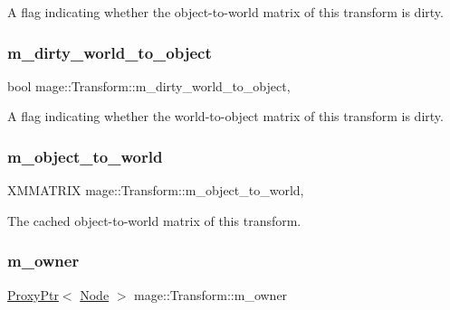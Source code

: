 A flag indicating whether the object-\/to-\/world matrix of this transform is dirty. \hypertarget{classmage_1_1_transform_af0778d1dbe677b7af16add3c14a6259e}{}\label{classmage_1_1_transform_af0778d1dbe677b7af16add3c14a6259e} 
\subsubsection{\texorpdfstring{m\+\_\+dirty\+\_\+world\+\_\+to\+\_\+object}{m\_dirty\_world\_to\_object}}
{\footnotesize\ttfamily bool mage\+::\+Transform\+::m\+\_\+dirty\+\_\+world\+\_\+to\+\_\+object\hspace{0.3cm}{\ttfamily [mutable]}, {\ttfamily [private]}}

A flag indicating whether the world-\/to-\/object matrix of this transform is dirty. \hypertarget{classmage_1_1_transform_a4e227321c984ddf2ece92d7954ae5db9}{}\label{classmage_1_1_transform_a4e227321c984ddf2ece92d7954ae5db9} 
\subsubsection{\texorpdfstring{m\+\_\+object\+\_\+to\+\_\+world}{m\_object\_to\_world}}
{\footnotesize\ttfamily X\+M\+M\+A\+T\+R\+IX mage\+::\+Transform\+::m\+\_\+object\+\_\+to\+\_\+world\hspace{0.3cm}{\ttfamily [mutable]}, {\ttfamily [private]}}

The cached object-\/to-\/world matrix of this transform. \hypertarget{classmage_1_1_transform_a3cf772460725cbb2d939f1f558e1d60c}{}\label{classmage_1_1_transform_a3cf772460725cbb2d939f1f558e1d60c} 
\subsubsection{\texorpdfstring{m\+\_\+owner}{m\_owner}}
{\footnotesize\ttfamily \hyperlink{classmage_1_1_proxy_ptr}{Proxy\+Ptr}$<$ \hyperlink{classmage_1_1_node}{Node} $>$ mage\+::\+Transform\+::m\+\_\+owner\hspace{0.3cm}{\ttfamily [private]}}

